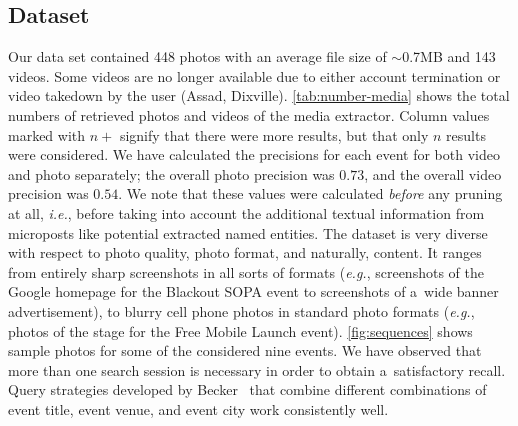 \subsection{Dataset}
Our data set contained 448 photos with an average file size of
$\sim$0.7MB and 143 videos.
Some videos are no longer available due to either
account termination or video takedown by the user
(Assad, Dixville).
\autoref{tab:number-media} shows the total
numbers of retrieved photos and videos of the media extractor.
Column values marked with $n+$ signify that there were more 
results, but that only $n$ results were considered. 
We have calculated the precisions for each event for both video 
and photo separately; the overall photo precision was $0.73$,
and the overall video precision was $0.54$.
We note that these values were calculated \emph{before}
any pruning at all, \emph{i.e.}, before taking into account
the additional textual information from microposts like
potential extracted named entities.
The dataset is very diverse with respect to photo quality,
photo format, and naturally, content.
It ranges from entirely sharp screenshots
in all sorts of formats (\emph{e.g.},
screenshots of the Google homepage for the Blackout SOPA event
to screenshots of a~wide banner advertisement),
to blurry cell phone photos in standard photo formats
(\emph{e.g.}, photos of the stage
for the Free Mobile Launch event).
\autoref{fig:sequences} shows sample photos for
some of the considered nine events.
We have observed that more than one search session is necessary
in order to obtain a~satisfactory recall.
Query strategies developed by Becker~\cite{becker2012plannedevents}
that combine different combinations of event title,
event venue, and event city work consistently well.

